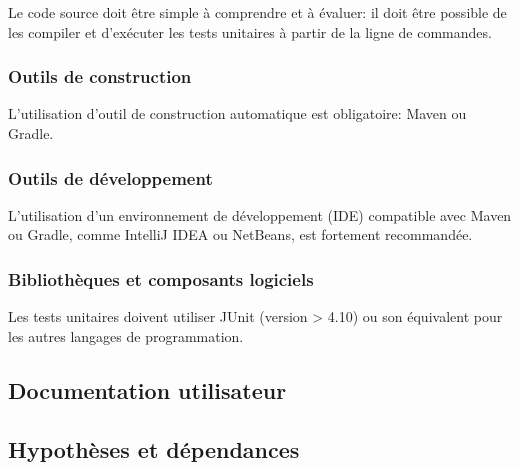 \begin{requirement}
Le code source doit être simple à comprendre et à évaluer: il doit être possible de les compiler et d'exécuter les tests unitaires à partir de la ligne de commandes.	
\end{requirement}



\subsubsection{Outils de construction}
\begin{requirement}
	L’utilisation d’outil de construction automatique est obligatoire: Maven ou Gradle.
\end{requirement}

\subsubsection{Outils de développement}
\begin{requirement}[{IDE}]
	L’utilisation d’un environnement de développement (IDE) compatible avec Maven ou Gradle, comme IntelliJ IDEA ou NetBeans, est fortement recommandée. 
\end{requirement}

\subsubsection{Bibliothèques et composants logiciels}
Les tests unitaires doivent utiliser JUnit (version > 4.10) ou son équivalent pour les autres langages de programmation.


	\subsection{Documentation utilisateur}

	\subsection{Hypothèses et dépendances}
	
